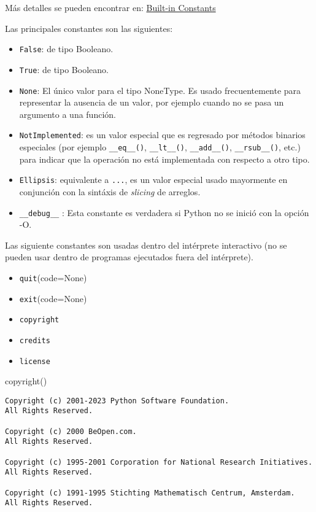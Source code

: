 \documentclass[
  letterpaper,
  DIV=11,
  numbers=noendperiod]{scrreprt}
\newenvironment{Shaded}{\begin{snugshade}}{\end{snugshade}}
\newcommand{\NormalTok}[1]{\textcolor[rgb]{0.00,0.23,0.31}{#1}}
\providecommand{\tightlist}{%
  \setlength{\itemsep}{0pt}\setlength{\parskip}{0pt}}\usepackage{longtable,booktabs,array}
\begin{document}
Más detalles se pueden encontrar en:
\href{https://docs.python.org/3/library/constants.html}{Built-in
Constants}

Las principales constantes son las siguientes:

\begin{itemize}
\item
  \texttt{False}: de tipo Booleano.
\item
  \texttt{True}: de tipo Booleano.
\item
  \texttt{None}: El único valor para el tipo NoneType. Es usado
  frecuentemente para representar la ausencia de un valor, por ejemplo
  cuando no se pasa un argumento a una función.
\item
  \texttt{NotImplemented}: es un valor especial que es regresado por
  métodos binarios especiales (por ejemplo \texttt{\_\_eq\_\_()},
  \texttt{\_\_lt\_\_()}, \texttt{\_\_add\_\_()},
  \texttt{\_\_rsub\_\_()}, etc.) para indicar que la operación no está
  implementada con respecto a otro tipo.
\item
  \texttt{Ellipsis}: equivalente a \texttt{...}, es un valor especial
  usado mayormente en conjunción con la sintáxis de \emph{slicing} de
  arreglos.
\item
  \texttt{\_\_debug\_\_} : Esta constante es verdadera si Python no se
  inició con la opción -O.
\end{itemize}

Las siguiente constantes son usadas dentro del intérprete interactivo
(no se pueden usar dentro de programas ejecutados fuera del intérprete).

\begin{itemize}
\tightlist
\item
  \texttt{quit}(code=None)
\item
  \texttt{exit}(code=None)
\item
  \texttt{copyright}
\item
  \texttt{credits}
\item
  \texttt{license}
\end{itemize}

\begin{Shaded}
\begin{Highlighting}[]
\NormalTok{copyright()}
\end{Highlighting}
\end{Shaded}

\begin{verbatim}
Copyright (c) 2001-2023 Python Software Foundation.
All Rights Reserved.

Copyright (c) 2000 BeOpen.com.
All Rights Reserved.

Copyright (c) 1995-2001 Corporation for National Research Initiatives.
All Rights Reserved.

Copyright (c) 1991-1995 Stichting Mathematisch Centrum, Amsterdam.
All Rights Reserved.
\end{verbatim}
\end{document}
